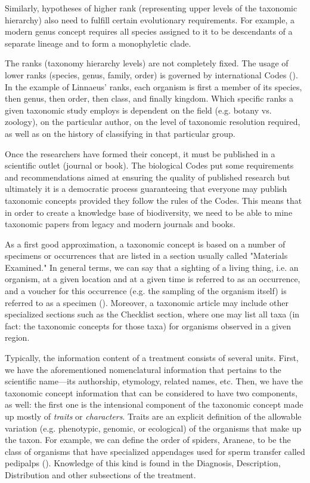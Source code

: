 Similarly, hypotheses of higher rank (representing upper levels of the taxonomic hierarchy) also need to fulfill certain evolutionary requirements. For example, a modern genus concept requires all species assigned to it to be descendants of a separate lineage and to form a monophyletic clade.

The ranks (taxonomy hierarchy levels) are not completely fixed. The usage of lower ranks (species, genus, family, order) is governed by international Codes (\cite{international_commission_on_zoological_nomenclature_international_1999,noauthor_international_2012}). In the example of Linnaeus' ranks, each organism is first a member of its species, then genus, then order, then class, and finally kingdom. Which specific ranks a given taxonomic study employs is dependent on the field (e.g. botany vs. zoology), on the particular author, on the level of taxonomic resolution required, as well as on the history of classifying in that particular group.

Once the researchers have formed their concept, it must be published in a scientific outlet (journal or book). The biological Codes put some requirements and recommendations aimed at ensuring the quality of published research but ultimately it is a democratic process guaranteeing that everyone may publish taxonomic concepts provided they follow the rules of the Codes. This means that in order to create a knowledge base of biodiversity, we need to be able to mine taxonomic papers from legacy and modern journals and books.

As a first good approximation, a taxonomic concept is based on a number of specimens or occurrences that are listed in a section usually called "Materials Examined." In general terms, we can say that a sighting of a living thing, i.e. an organism, at a given location and at a given time is referred to as an occurrence, and a voucher for this occurrence (e.g. the sampling of the organism itself) is referred to as a specimen (\cite{baskauf_darwin-sw:_2016}). Moreover, a taxonomic article may include other specialized sections such as the Checklist section, where one may list all taxa (in fact: the taxonomic concepts for those taxa) for organisms observed in a given region.

Typically, the information content of a treatment consists of several units. First, we have the aforementioned nomenclatural information that pertains to the scientific name---its authorship, etymology, related names, etc. Then, we have the taxonomic concept information that can be considered to have two components, as well: the first one is the intensional component of the taxonomic concept made up mostly of \emph{traits} or \emph{characters}. Traits are an explicit definition of the allowable variation (e.g. phenotypic, genomic, or ecological) of the organisms that make up the taxon. For example, we can define the order of spiders, Araneae, to be the class of organisms that have specialized appendages used for sperm transfer called pedipalps (\cite{platnick_cladograms_2001}). Knowledge of this kind is found in the Diagnosis, Description, Distribution and other subsections of the treatment.

